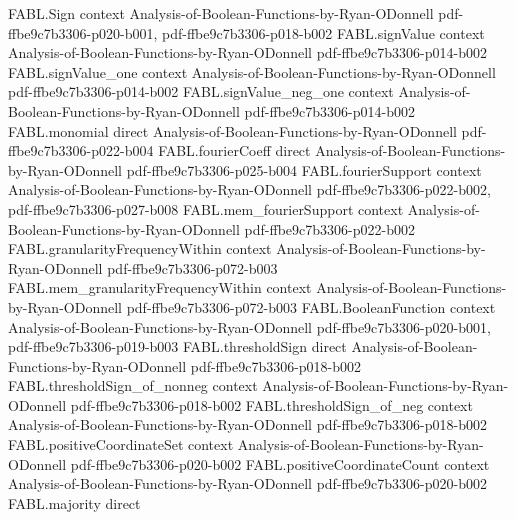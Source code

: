 \begin{theorem}
\label{FABL.totalInfluence_const}
\leanok
{}
\proofstep
  {FABL.Sign}
  {context}
  {Analysis-of-Boolean-Functions-by-Ryan-ODonnell}
  {pdf-ffbe9c7b3306-p020-b001,
    pdf-ffbe9c7b3306-p018-b002}
\proofstep
  {FABL.signValue}
  {context}
  {Analysis-of-Boolean-Functions-by-Ryan-ODonnell}
  {pdf-ffbe9c7b3306-p014-b002}
\proofstep
  {FABL.signValue_one}
  {context}
  {Analysis-of-Boolean-Functions-by-Ryan-ODonnell}
  {pdf-ffbe9c7b3306-p014-b002}
\proofstep
  {FABL.signValue_neg_one}
  {context}
  {Analysis-of-Boolean-Functions-by-Ryan-ODonnell}
  {pdf-ffbe9c7b3306-p014-b002}
\proofstep
  {FABL.monomial}
  {direct}
  {Analysis-of-Boolean-Functions-by-Ryan-ODonnell}
  {pdf-ffbe9c7b3306-p022-b004}
\proofstep
  {FABL.fourierCoeff}
  {direct}
  {Analysis-of-Boolean-Functions-by-Ryan-ODonnell}
  {pdf-ffbe9c7b3306-p025-b004}
\proofstep
  {FABL.fourierSupport}
  {context}
  {Analysis-of-Boolean-Functions-by-Ryan-ODonnell}
  {pdf-ffbe9c7b3306-p022-b002,
    pdf-ffbe9c7b3306-p027-b008}
\proofstep
  {FABL.mem_fourierSupport}
  {context}
  {Analysis-of-Boolean-Functions-by-Ryan-ODonnell}
  {pdf-ffbe9c7b3306-p022-b002}
\proofstep
  {FABL.granularityFrequencyWithin}
  {context}
  {Analysis-of-Boolean-Functions-by-Ryan-ODonnell}
  {pdf-ffbe9c7b3306-p072-b003}
\proofstep
  {FABL.mem_granularityFrequencyWithin}
  {context}
  {Analysis-of-Boolean-Functions-by-Ryan-ODonnell}
  {pdf-ffbe9c7b3306-p072-b003}
\proofstep
  {FABL.BooleanFunction}
  {context}
  {Analysis-of-Boolean-Functions-by-Ryan-ODonnell}
  {pdf-ffbe9c7b3306-p020-b001,
    pdf-ffbe9c7b3306-p019-b003}
\proofstep
  {FABL.thresholdSign}
  {direct}
  {Analysis-of-Boolean-Functions-by-Ryan-ODonnell}
  {pdf-ffbe9c7b3306-p018-b002}
\proofstep
  {FABL.thresholdSign_of_nonneg}
  {context}
  {Analysis-of-Boolean-Functions-by-Ryan-ODonnell}
  {pdf-ffbe9c7b3306-p018-b002}
\proofstep
  {FABL.thresholdSign_of_neg}
  {context}
  {Analysis-of-Boolean-Functions-by-Ryan-ODonnell}
  {pdf-ffbe9c7b3306-p018-b002}
\proofstep
  {FABL.positiveCoordinateSet}
  {context}
  {Analysis-of-Boolean-Functions-by-Ryan-ODonnell}
  {pdf-ffbe9c7b3306-p020-b002}
\proofstep
  {FABL.positiveCoordinateCount}
  {context}
  {Analysis-of-Boolean-Functions-by-Ryan-ODonnell}
  {pdf-ffbe9c7b3306-p020-b002}
\proofstep
  {FABL.majority}
  {direct}

\end{theorem}

